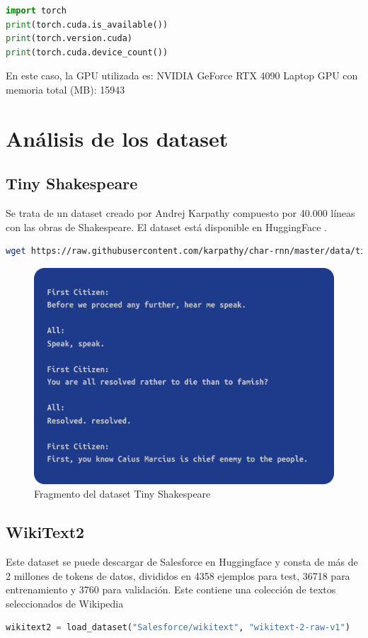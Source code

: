 \documentclass[11pt]{book}
\theoremstyle{plain}
\theoremstyle{definition}
\begin{document}
\begin{lstlisting}[language=Python]
import torch
print(torch.cuda.is_available())
print(torch.version.cuda)
print(torch.cuda.device_count())
\end{lstlisting}
En este caso, la GPU utilizada es: NVIDIA GeForce RTX 4090 Laptop GPU con memoria total (MB): 15943

\section{Análisis de los dataset}
\subsection{Tiny Shakespeare}
Se trata de un dataset creado por Andrej Karpathy compuesto por 40.000 líneas con las obras de Shakespeare. El dataset está disponible en HuggingFace \parencite{huggingface_tinyshakespeare}.

\begin{lstlisting}[language=bash]
wget https://raw.githubusercontent.com/karpathy/char-rnn/master/data/tinyshakespeare/input.txt -O tinyshakespeare.txt
\end{lstlisting}
\begin{figure}[h]
    \centering
    \includegraphics[width=0.5\linewidth]{img/tiny_shakespeare.png}
    \caption{Fragmento del dataset Tiny Shakespeare}
    \label{fig:placeholder1}
\end{figure}
\subsection{WikiText2}
Este dataset se puede descargar de Salesforce en Huggingface y consta de más de 2 millones de tokens de datos, divididos en 4358 ejemplos para test, 36718 para entrenamiento y 3760 para validación. Este contiene una colección de textos seleccionados de Wikipedia \parencite{huggingface_wikitext} \parencite{autonlp2020linkedwikitext}

\begin{lstlisting}[language=Python]
wikitext2 = load_dataset("Salesforce/wikitext", "wikitext-2-raw-v1")
\end{lstlisting}
\end{document}
